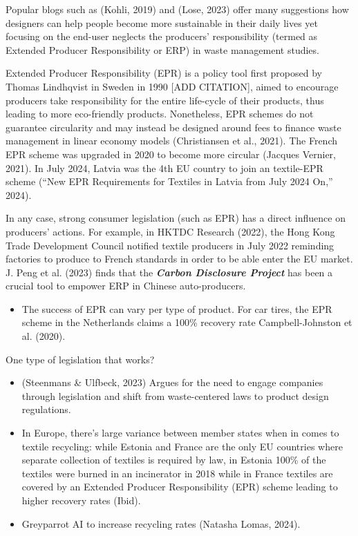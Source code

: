 \documentclass[
  letterpaper,
  DIV=11,
  numbers=noendperiod]{scrartcl}
\providecommand{\tightlist}{%
  \setlength{\itemsep}{0pt}\setlength{\parskip}{0pt}}\usepackage{longtable,booktabs,array}
\begin{document}
Popular blogs such as (Kohli, 2019) and (Lose, 2023) offer many
suggestions how designers can help people become more sustainable in
their daily lives yet focusing on the end-user neglects the producers'
responsibility (termed as Extended Producer Responsibility or ERP) in
waste management studies.

Extended Producer Responsibility (EPR) is a policy tool first proposed
by Thomas Lindhqvist in Sweden in 1990 {[}ADD CITATION{]}, aimed to
encourage producers take responsibility for the entire life-cycle of
their products, thus leading to more eco-friendly products. Nonetheless,
EPR schemes do not guarantee circularity and may instead be designed
around fees to finance waste management in linear economy models
(Christiansen et al., 2021). The French EPR scheme was upgraded in 2020
to become more circular (Jacques Vernier, 2021). In July 2024, Latvia
was the 4th EU country to join an textile-EPR scheme ({``New {EPR}
Requirements for Textiles in {Latvia} from {July} 2024 On,''} 2024).

In any case, strong consumer legislation (such as EPR) has a direct
influence on producers' actions. For example, in HKTDC Research (2022),
the Hong Kong Trade Development Council notified textile producers in
July 2022 reminding factories to produce to French standards in order to
be able enter the EU market. J. Peng et al. (2023) finds that the
\textbf{\emph{Carbon Disclosure Project}} has been a crucial tool to
empower ERP in Chinese auto-producers.

\begin{itemize}
\tightlist
\item
  The success of EPR can vary per type of product. For car tires, the
  EPR scheme in the Netherlands claims a 100\% recovery rate
  Campbell-Johnston et al. (2020).
\end{itemize}

One type of legislation that works?

\begin{itemize}
\item
  (Steenmans \& Ulfbeck, 2023) Argues for the need to engage companies
  through legislation and shift from waste-centered laws to product
  design regulations.
\item
  In Europe, there's large variance between member states when in comes
  to textile recycling: while Estonia and France are the only EU
  countries where separate collection of textiles is required by law, in
  Estonia 100\% of the textiles were burned in an incinerator in 2018
  while in France textiles are covered by an Extended Producer
  Responsibility (EPR) scheme leading to higher recovery rates (Ibid).
\item
  Greyparrot AI to increase recycling rates (Natasha Lomas, 2024).
\end{itemize}
\end{document}

